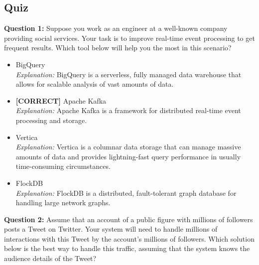 

\subsection*{Quiz}
\vspace{0.3cm}
\noindent
\textbf{Question 1:} Suppose you work as an engineer at a well-known company providing social services. Your task is to improve real-time event processing to get frequent results. Which tool below will help you the most in this scenario?
\\[0.2cm]
\begin{itemize}
 \item BigQuery
\\[0.1cm]
\textit{Explanation:} 
BigQuery is a serverless, fully managed data warehouse that allows for scalable analysis of vast amounts of data.
 \item \textbf{[CORRECT]} Apache Kafka
\\[0.1cm]
\textit{Explanation:} 
Apache Kafka is a framework for distributed real-time event processing and storage.
 \item Vertica
\\[0.1cm]
\textit{Explanation:} 
Vertica is a columnar data storage that can manage massive amounts of data and provides lightning-fast query performance in usually time-consuming circumstances.
 \item FlockDB
\\[0.1cm]
\textit{Explanation:} 
FlockDB is a distributed, fault-tolerant graph database for handling large network graphs.
\end{itemize}
\vspace{0.3cm}
\noindent
\textbf{Question 2:} Assume that an account of a public figure with millions of followers posts a Tweet on Twitter. Your system will need to handle millions of interactions with this Tweet by the account's millions of followers. Which solution below is the best way to handle this traffic, assuming that the system knows the audience details of the Tweet?
\\[0.2cm]
